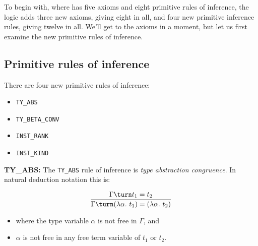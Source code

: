 
To begin with,
where \HOL{} has five axioms and eight primitive rules of inference,
the \HOLW{} logic adds three new axioms, giving eight in all,
and four new primitive inference rules,
giving twelve in all.
We'll get to the axioms in a moment, but let us first examine the new
primitive rules of inference.

\subsection{Primitive rules of inference}

There are four new primitive rules of inference:

\begin{itemize}
\item \texttt{TY\_ABS}
\item \texttt{TY\_BETA\_CONV}
\item \texttt{INST\_RANK}
\item \texttt{INST\_KIND}
\end{itemize}


\vspace{1em}
\noindent
{\bf {TY\_ABS}:}
%
The \texttt{TY\_ABS} rule of
inference is {\it type abstraction congruence}.
In natural deduction notation this is:

\[ \frac{\Gamma\turn t_1 = t_2}
        {\Gamma\turn (\lambda\alpha{.}~t_1) = (\lambda\alpha{.}~t_2)}\]

\begin{itemize}
\item where the type variable $\alpha$ is not free in $\Gamma$, and
\item $\alpha$ is not free in any free term variable of $t_1$ or $t_2$.
\end{itemize}

